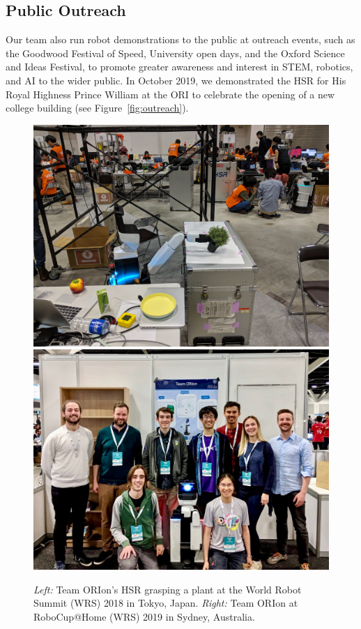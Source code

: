 \documentclass[runningheads,a4paper]{llncs}
\begin{document}
\subsection{Public Outreach}
Our team also run robot demonstrations to the public at outreach events, such as the Goodwood Festival of Speed, University open days, and the Oxford Science and Ideas Festival, to promote greater awareness and interest in STEM, robotics, and AI to the wider public. In October 2019, we demonstrated the HSR for His Royal Highness Prince William at the ORI to celebrate the opening of a new college building \cite{PrinceWilliamArticle} (see Figure~\ref{fig:outreach}).

\begin{figure}[tb]
	\begin{center}
  		\includegraphics[width=.41\columnwidth, clip, trim=0 0ex 0ex 50ex]{images/hsr_grasping.jpg}
  		\includegraphics[width=.49\columnwidth, clip, trim=0 0ex 0ex 50ex]{images/robocup_team.jpg}
	\end{center} 
	\caption{\emph{Left:} Team ORIon's HSR grasping a plant at the World Robot Summit (WRS) 2018 in Tokyo, Japan. \emph{Right:} Team ORIon at RoboCup@Home (WRS) 2019 in Sydney, Australia.}
	\label{fig:pastcompetitions}
\end{figure}
\end{document}
